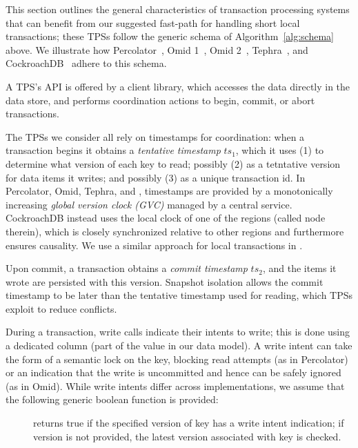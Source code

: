 
This section outlines the general characteristics of transaction processing systems that can benefit from our 
suggested fast-path for handling short local transactions; these TPSs follow the generic schema of Algorithm~\ref{alg:schema} above. 
We illustrate how 
Percolator~\cite{Percolator2010}, Omid 1~\cite{OmidICDE2014}, Omid 2~\cite{omid-blog}, 
Tephra~\cite{tephra}, and CockroachDB~\cite{cockroach} adhere to this schema.

A TPS's API is offered by a client library, which accesses the data directly in the data store, and 
performs coordination actions to begin, commit, or abort transactions. 

The TPSs we consider all rely on timestamps for coordination: when a transaction begins it obtains a \emph{tentative timestamp} $ts_1$, 
which it uses (1) to determine what version of each key to read; possibly (2) as a tetntative version for data items it writes; and possibly (3) as a unique transaction id.   
In Percolator, Omid, Tephra, and \sys, timestamps are provided by a monotonically
increasing \emph{global version  clock (GVC)} managed by a central service. 
CockroachDB instead uses the local clock of
one of the regions (called node therein), which is closely synchronized relative to other regions and furthermore ensures causality.
We use a similar approach for local transactions in \sys.

Upon commit, a transaction obtains a \emph{commit timestamp} $ts_2$, and the items it wrote are persisted with this version.
Snapshot isolation allows the commit timestamp to be later than the tentative timestamp used for reading, 
which TPSs exploit to reduce conflicts.

During a transaction, write calls indicate their intents to write; this is done using
a dedicated column (part of the value in our data model).
A write intent can take the form of a semantic lock on the key, blocking read attempts (as in Percolator) or
an indication that the write is uncommitted and hence can be safely ignored (as in Omid). 
While write intents differ across implementations, we assume that the following generic boolean function is  provided:
\begin{description}
\item[] returns true if the specified version of key has a write intent indication; if version is not provided, the 
latest version associated with key is checked.
\end{description}

